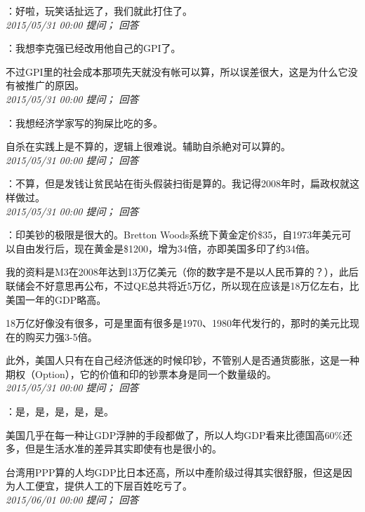 \documentclass[twocolumn]{ctexart}
\begin{document}
：好啦，玩笑话扯远了，我们就此打住了。\\

\textit{\hfill\noindent\small 2015/05/31 00:00 提问； 回答}

：我想李克强已经改用他自己的GPI了。

不过GPI里的社会成本那项先天就没有帐可以算，所以误差很大，这是为什么它没有被推广的原因。\\

\textit{\hfill\noindent\small 2015/05/31 00:00 提问； 回答}

：我想经济学家写的狗屎比吃的多。

自杀在实践上是不算的，逻辑上很难说。辅助自杀絶对可以算的。\\

\textit{\hfill\noindent\small 2015/05/31 00:00 提问； 回答}

：不算，但是发钱让贫民站在街头假装扫街是算的。我记得2008年时，扁政权就这样做过。\\

\textit{\hfill\noindent\small 2015/05/31 00:00 提问； 回答}

：印美钞的极限是很大的。Bretton Woods系统下黄金定价\$35，自1973年美元可以自由发行后，现在黄金是\$1200，增为34倍，亦即美国多印了约34倍。

我的资料是M3在2008年达到13万亿美元（你的数字是不是以人民币算的？），此后联储会不好意思再公布，不过QE总共将近5万亿，所以现在应该是18万亿左右，比美国一年的GDP略高。

18万亿好像没有很多，可是里面有很多是1970、1980年代发行的，那时的美元比现在的购买力强3-5倍。

此外，美国人只有在自己经济低迷的时候印钞，不管别人是否通货膨胀，这是一种期权（Option），它的价值和印的钞票本身是同一个数量级的。\\

\textit{\hfill\noindent\small 2015/05/31 00:00 提问； 回答}

：是，是，是，是，是。

美国几乎在每一种让GDP浮肿的手段都做了，所以人均GDP看来比德国高60\%还多，但是生活水准的差异其实即使有也是很小的。

台湾用PPP算的人均GDP比日本还高，所以中產阶级过得其实很舒服，但这是因为人工便宜，提供人工的下层百姓吃亏了。\\

\textit{\hfill\noindent\small 2015/06/01 00:00 提问； 回答}
\end{document}
